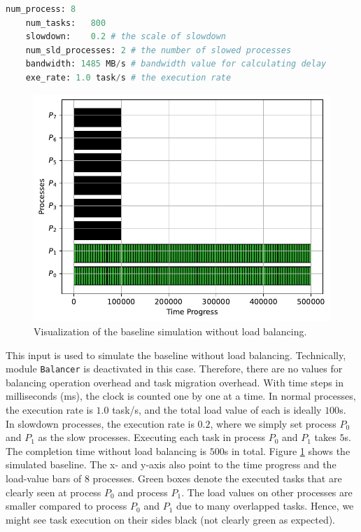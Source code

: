 \begin{lstlisting}[language=Python, caption={Input sample for the baseline simulation.}, label={lst:sim_input_sample}]
	num_process: 8
	num_tasks:   800
	slowdown:    0.2 # the scale of slowdown
	num_sld_processes: 2 # the number of slowed processes
	bandwidth: 1485 MB/s # bandwidth value for calculating delay
	exe_rate: 1.0 task/s # the execution rate
\end{lstlisting}
\hfill

\begin{figure}[t]
  \centering
  \includegraphics[scale=0.65]{./pictures/poc_implementation/poc_visualize_baseline_case_8_processes.pdf}
	\caption{Visualization of the baseline simulation without load balancing.}
	\label{fig:simulator_baseline_case}
\end{figure}

This input is used to simulate the baseline without load balancing. Technically, module \texttt{Balancer} is deactivated in this case. Therefore, there are no values for balancing operation overhead and task migration overhead. With time steps in milliseconds (ms), the clock is counted one by one at a time. In normal processes, the execution rate is $1.0$ task/s, and the total load value of each is ideally $100$s. In slowdown processes, the execution rate is $0.2$, where we simply set process $P_{0}$ and $P_{1}$ as the slow processes. Executing each task in process $P_{0}$ and $P_{1}$ takes $5$s. The completion time without load balancing is $500$s in total. Figure \ref{fig:simulator_baseline_case} shows the simulated baseline. The x- and y-axis also point to the time progress and the load-value bars of $8$ processes. Green boxes denote the executed tasks that are clearly seen at process $P_{0}$ and process $P_{1}$. The load values on other processes are smaller compared to process $P_{0}$ and $P_{1}$ due to many overlapped tasks. Hence, we might see task execution on their sides black (not clearly green as expected).\\

